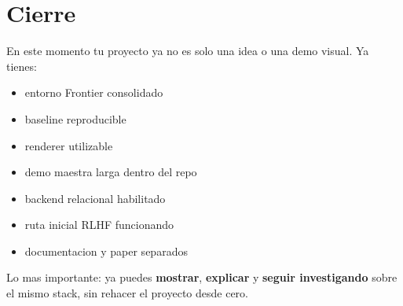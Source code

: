 \documentclass[11pt]{article}
\begin{document}
\section{Cierre}

En este momento tu proyecto ya no es solo una idea o una demo visual. Ya tienes:
\begin{itemize}
    \item entorno Frontier consolidado
    \item baseline reproducible
    \item renderer utilizable
    \item demo maestra larga dentro del repo
    \item backend relacional habilitado
    \item ruta inicial RLHF funcionando
    \item documentacion y paper separados
\end{itemize}

Lo mas importante: ya puedes \textbf{mostrar}, \textbf{explicar} y \textbf{seguir investigando} sobre el mismo stack, sin rehacer el proyecto desde cero.
\end{document}

